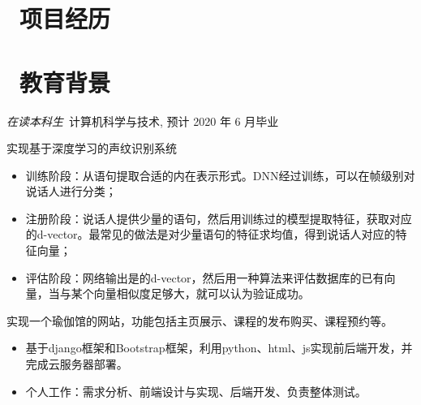 \documentclass{resume}
\begin{document}



\section{\faUsers\ 项目经历} 
\section{\faGraduationCap\  教育背景}
\textit{在读本科生}\ 计算机科学与技术, 预计 2020 年 6 月毕业

\begin{onehalfspacing}
实现基于深度学习的声纹识别系统
\begin{itemize}
  \item 训练阶段：从语句提取合适的内在表示形式。DNN经过训练，可以在帧级别对说话人进行分类；
  \item 注册阶段：说话人提供少量的语句，然后用训练过的模型提取特征，获取对应的d-vector。最常见的做法是对少量语句的特征求均值，得到说话人对应的特征向量；
  \item 评估阶段：网络输出是的d-vector，然后用一种算法来评估数据库的已有向量，当与某个向量相似度足够大，就可以认为验证成功。
\end{itemize}
\end{onehalfspacing}

\begin{onehalfspacing}
实现一个瑜伽馆的网站，功能包括主页展示、课程的发布购买、课程预约等。
\begin{itemize}
  \item 基于django框架和Bootstrap框架，利用python、html、js实现前后端开发，并完成云服务器部署。
  \item 个人工作：需求分析、前端设计与实现、后端开发、负责整体测试。
\end{itemize}
\end{onehalfspacing}

\end{document}
